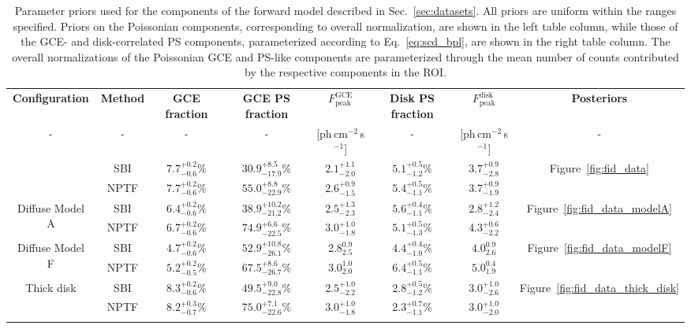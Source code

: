 \documentclass[prd,aps,10pt,nofootinbib,twocolumn,superscriptaddress,preprintnumbers,balancelastpage,longbibliography]{revtex4-1}
\newcommand\Tstrut{\rule{0pt}{2.6ex}}         %
\newcommand\Bstrut{\rule[-0.9ex]{0pt}{0pt}}   %
\begin{document}
%
\begin{table}[!t]
    \footnotesize
    \begin{center}
    \begin{tabular}{cc|cccccc}
    \toprule
    \textbf{Configuration}  & \textbf{Method}  & \textbf{GCE fraction}	 & \textbf{GCE PS fraction}  & $F_{\mathrm{peak}}^\mathrm{GCE}$	&  \textbf{Disk PS fraction} &  $F_{\mathrm{peak}}^\mathrm{disk}$	&  \textbf{Posteriors}\Tstrut\Bstrut	\\   
    - & - & - & - & [ph\,cm$^{-2}$\,s$^{-1}$] & - & [ph\,cm$^{-2}$\,s$^{-1}$]	& -\Tstrut\Bstrut	\\   
    \Xhline{1\arrayrulewidth}
    \multirow{2}{*}{Fiducial} & SBI & $7.7^{+0.2}_{-0.6}\%$ & $30.9^{+8.5}_{-17.9}\%$ & $2.1^{+1.1}_{-2.0}$ & $5.1^{+0.5}_{-1.2}\%$ &  $3.7^{+0.9}_{-2.8}$ & \multirow{2}{*}{Figure~\ref{fig:fid_data}}\Tstrut \\
    & NPTF & $7.7^{+0.2}_{-0.6}\%$ & $55.0^{+8.8}_{-22.9}\%$ &  $2.6^{+0.9}_{-1.5}$ & $5.4^{+0.5}_{-1.1}\%$ & $3.7^{+0.9}_{-1.9}$\Bstrut &\\ 
    \hline
    \multirow{2}{*}{Diffuse Model A} & SBI & $6.4^{+0.2}_{-0.6}\%$  & $38.9^{+10.2}_{-21.2}\%$  & $2.5^{+1.3}_{-2.3}$ & $5.6^{+0.4}_{-1.1}\%$ & $2.8^{+1.2}_{-2.4}$ & \multirow{2}{*}{Figure~\ref{fig:fid_data_modelA}}\Tstrut  \\ 
    & NPTF & $6.7^{+0.2}_{-0.6}\%$ & $74.9^{+6.6}_{-22.5}\%$ & $3.0^{+1.0}_{-1.8}$ &  $5.1^{+0.5}_{-1.3}\%$ & $4.3^{+0.6}_{-2.2}$\Bstrut &\\
    \hline
    \multirow{2}{*}{Diffuse Model F} & SBI & $4.7^{+0.2}_{-0.6}\%$ & $52.9^{+10.8}_{-26.1}\%$ & $2.8^{0.9}_{2.5}$ & $4.4^{+0.4}_{-1.0}\%$ & $4.0^{0.9}_{2.6}$
    & \multirow{2}{*}{Figure~\ref{fig:fid_data_modelF}}\Tstrut \\
    & NPTF & $5.2^{+0.2}_{-0.5}\%$ & $67.5^{+8.6}_{-26.7}\%$ & $3.0^{1.0}_{2.0}$ & $6.4^{+0.5}_{-1.1}\%$ & $5.0^{0.4}_{1.9}$\Bstrut &\\
    \hline
    \multirow{2}{*}{Thick disk} & SBI & $8.3^{+0.2}_{-0.6}\%$ & $49.5^{+9.0}_{-22.8}\%$ & $2.5^{+1.0}_{-2.2}$ & $2.8^{+0.5}_{-1.2}\%$ &  $3.0^{+1.0}_{-2.6}$ & \multirow{2}{*}{Figure~\ref{fig:fid_data_thick_disk}}\Tstrut \\
    & NPTF & $8.2^{+0.3}_{-0.7}\%$ & $75.0^{+7.1}_{-22.6}\%$ & $3.0^{+1.0}_{-1.8}$ & $2.3^{+0.7}_{-1.1}\%$ & $3.0^{+1.0}_{-2.0}$\Bstrut &\\
    \botrule
    \end{tabular}
    \end{center}
    \caption{Parameter priors used for the components of the forward model described in Sec.~\ref{sec:datasets}. All priors are uniform within the ranges specified. Priors on the Poissonian components, corresponding to overall normalization, are shown in the left table column, while those of the GCE- and disk-correlated PS components, parameterized according to Eq.~\eqref{eq:scd_bpl}, are shown in the right table column. The overall normalizations of the Poissonian GCE and PS-like components are parameterized through the mean number of counts contributed by the respective components in the ROI.}
    \label{tab:results}
    \end{table}    
\end{document}
